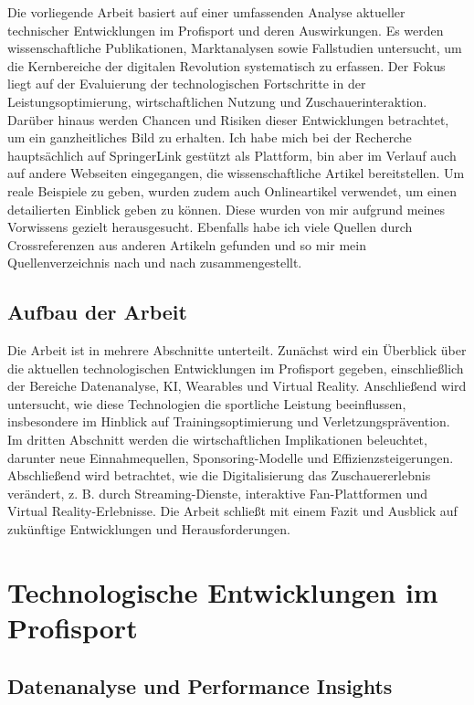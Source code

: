 \documentclass[
  number]{elsarticle}
\begin{document}
Die vorliegende Arbeit basiert auf einer umfassenden Analyse aktueller
technischer Entwicklungen im Profisport und deren Auswirkungen. Es
werden wissenschaftliche Publikationen, Marktanalysen sowie Fallstudien
untersucht, um die Kernbereiche der digitalen Revolution systematisch zu
erfassen. Der Fokus liegt auf der Evaluierung der technologischen
Fortschritte in der Leistungsoptimierung, wirtschaftlichen Nutzung und
Zuschauerinteraktion. Darüber hinaus werden Chancen und Risiken dieser
Entwicklungen betrachtet, um ein ganzheitliches Bild zu erhalten. Ich
habe mich bei der Recherche hauptsächlich auf SpringerLink gestützt als
Plattform, bin aber im Verlauf auch auf andere Webseiten eingegangen,
die wissenschaftliche Artikel bereitstellen. Um reale Beispiele zu
geben, wurden zudem auch Onlineartikel verwendet, um einen detailierten
Einblick geben zu können. Diese wurden von mir aufgrund meines
Vorwissens gezielt herausgesucht. Ebenfalls habe ich viele Quellen durch
Crossreferenzen aus anderen Artikeln gefunden und so mir mein
Quellenverzeichnis nach und nach zusammengestellt.

\subsection{Aufbau der Arbeit}\label{aufbau-der-arbeit}

Die Arbeit ist in mehrere Abschnitte unterteilt. Zunächst wird ein
Überblick über die aktuellen technologischen Entwicklungen im Profisport
gegeben, einschließlich der Bereiche Datenanalyse, KI, Wearables und
Virtual Reality. Anschließend wird untersucht, wie diese Technologien
die sportliche Leistung beeinflussen, insbesondere im Hinblick auf
Trainingsoptimierung und Verletzungsprävention. Im dritten Abschnitt
werden die wirtschaftlichen Implikationen beleuchtet, darunter neue
Einnahmequellen, Sponsoring-Modelle und Effizienzsteigerungen.
Abschließend wird betrachtet, wie die Digitalisierung das
Zuschauererlebnis verändert, z. B. durch Streaming-Dienste, interaktive
Fan-Plattformen und Virtual Reality-Erlebnisse. Die Arbeit schließt mit
einem Fazit und Ausblick auf zukünftige Entwicklungen und
Herausforderungen.

\section{Technologische Entwicklungen im
Profisport}\label{technologische-entwicklungen-im-profisport}

\subsection{Datenanalyse und Performance
Insights}\label{datenanalyse-und-performance-insights}
\end{document}
